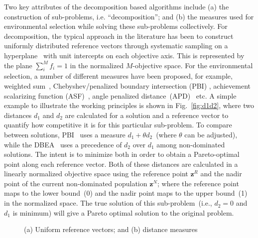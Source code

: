 \documentclass[twocolumn,10pt]{asme2ej}
\begin{document}
Two key attributes of the decomposition based algorithms include (a) the construction of sub-problems, i.e. ``decomposition''; and (b) the measures used for environmental selection while solving these sub-problems collectively. For decomposition, the typical approach in the literature has been to construct uniformly distributed reference vectors through systematic sampling on a hyperplane~\cite{KHTdas1998normal} with unit intercepts on each objective axis. This is represented by the plane $\sum^{M}_i{f_i}=1$ in the normalized $M$-objective space. For the environmental selection, a number of different measures have been proposed, for example, weighted sum~\cite{KHTmiettinen2012nonlinear,KHTVoss2008}, Chebyshev/penalized boundary intersection (PBI) \cite{KHTzhang2007moead}, achievement scalarizing function (ASF)~\cite{KHTmiettinen2012nonlinear,KHTYuan2016many}, angle penalized distance~(APD)~\cite{KHTCheng2016many} etc. A simple example to illustrate the working principles is shown in Fig.~\ref{fig:d1d2}, where two distances $d_1$ and $d_2$ are calculated for a solution and a reference vector to quantify how competitive it is for this particular sub-problem. To compare between solutions, PBI~\cite{KHTzhang2007moead} uses a measure $d_1+\theta d_2$~(where $\theta$ can be adjusted), while the DBEA~\cite{Asafuddoula2015} uses a precedence of $d_2$ over $d_1$ among non-dominated solutions. The intent is to minimize both in order to obtain a Pareto-optimal point along each reference vector. {\color{blue}Both of these distances are calculated in a linearly normalized objective space using the reference point $\mathbf{z}^R$ and the nadir point of the current non-dominated population $\mathbf{z}^N$; where the reference point maps to the lower bound~(0) and the nadir point maps to the upper bound~(1) in the normalized space}. The true solution of this sub-problem~(i.e., $d_2=0$ and $d_1$ is minimum) will give a Pareto optimal solution to the original problem. 

\begin{figure}[!htb]
\begin{center}
 \quad
{}\quad
\caption{(a) Uniform reference vectors; and (b) distance measures}
\label{fig:nbi}     
\end{center}
\end{figure}
\vspace{-1em}
\end{document}
